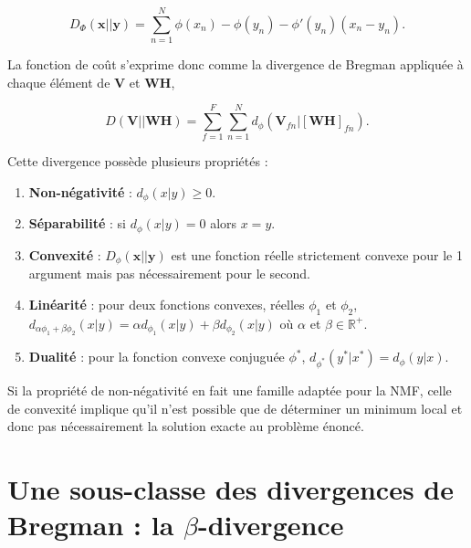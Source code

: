 \begin{equation}\label{eq:divBregWise}
D_{\Phi}(\textbf{x}\vert\vert \textbf{y}) = \sum_{n=1}^N \phi(x_n)-\phi(y_n)-\phi'(y_n)(x_n-y_n).
\end{equation}

La fonction de coût s'exprime donc comme la divergence de Bregman appliquée à chaque élément de $\mathbf{V}$ et $\mathbf{WH}$,

\begin{equation}\label{eq:similarite2}
D\left(\textbf{V} \vert\vert \textbf{WH} \right) = \sum_{f = 1}^{F} \sum_{n = 1}^{N} d_{\phi}
\left(\textbf{V}_{fn} \vert \left[ \textbf{WH} \right]_{fn} \right).
\end{equation}


Cette divergence possède plusieurs propriétés :

\begin{enumerate}
\item \textbf{Non-négativité} : $d_{\phi}(x\vert y) \geq 0$.

\item \textbf{Séparabilité} : si $d_{\phi}(x\vert y) = 0$ alors $x = y$.

\item \textbf{Convexité} : $D_{\phi}(\textbf{x}\vert\vert \textbf{y})$ est une fonction réelle strictement convexe pour le 1\ier{} argument mais pas nécessairement pour le second.

\item \textbf{Linéarité} : pour deux fonctions convexes, réelles $\phi_1$ et $\phi_2$,  $d_{\alpha \phi_1 + \beta \phi_2}(x\vert y) = \alpha d_{\phi_1}(x\vert y)+\beta d_{\phi_2}(x\vert y)$ où $\alpha$ et $\beta \in \mathbb{R}^+$.

\item \textbf{Dualité} : pour la fonction convexe conjuguée $\phi^{\ast}$, $d_{\phi^{\ast}}(y^{\ast}\vert x^{\ast}) = d_{\phi}(y \vert x)$.
\end{enumerate}

Si la propriété de non-négativité en fait une famille adaptée pour la NMF, celle de convexité implique qu'il n'est possible que de déterminer un minimum local et donc pas nécessairement la solution exacte au problème énoncé.

\section{Une sous-classe des divergences de Bregman : la $\beta$-divergence}

